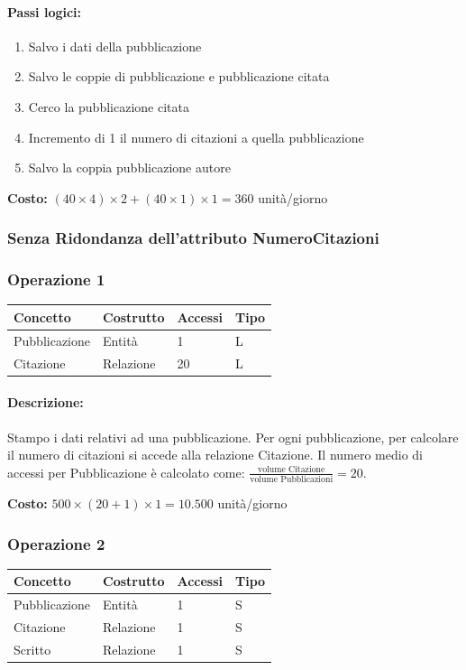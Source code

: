 \documentclass[a4paper,12pt]{article}
\begin{document}
\paragraph{Passi logici:}
\begin{enumerate}[label=\textbf{\arabic*)}, start=1, leftmargin=1.5cm]
    \item Salvo i dati della pubblicazione
    \item Salvo le coppie di pubblicazione e pubblicazione citata
    \item Cerco la pubblicazione citata
    \item Incremento di 1 il numero di citazioni a quella pubblicazione
    \item Salvo la coppia pubblicazione autore
\end{enumerate}

\textbf{Costo:} $(40 \times 4) \times 2 + (40 \times 1) \times 1 = 360$ unità/giorno

\subsubsection{Senza Ridondanza dell'attributo NumeroCitazioni} 

\subsubsection*{Operazione 1}
\begin{tabular}{llll}
\toprule
\textbf{Concetto} & \textbf{Costrutto} & \textbf{Accessi} & \textbf{Tipo} \\
\midrule
Pubblicazione & Entità    & 1  & L \\
Citazione     & Relazione & 20 & L \\
\bottomrule
\end{tabular}

\paragraph{Descrizione:} 
Stampo i dati relativi ad una pubblicazione. Per ogni pubblicazione, per calcolare il numero di citazioni si accede alla relazione Citazione. Il numero medio di accessi per Pubblicazione è calcolato come: $\frac{\text{volume Citazione}}{\text{volume Pubblicazioni}} = 20$.

\medskip
\textbf{Costo:} $500 \times (20 + 1) \times 1 = 10.500$ unità/giorno

\subsubsection*{Operazione 2}
\begin{tabular}{llll}
\toprule
\textbf{Concetto} & \textbf{Costrutto} & \textbf{Accessi} & \textbf{Tipo} \\
\midrule
Pubblicazione & Entità & 1 & S \\
Citazione          & Relazione & 1 & S \\
Scritto        & Relazione & 1 & S \\
\bottomrule
\end{tabular}
\end{document}
